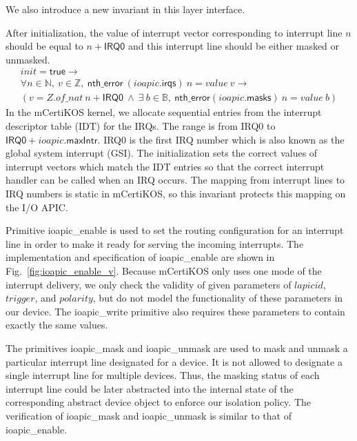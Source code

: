 We also introduce a new invariant in this layer interface.

\begin{invariant}
	After initialization, the value of interrupt vector corresponding to interrupt line $n$ should be equal to $n + \textsf{IRQ0}$ and this interrupt line should be either masked or unmasked.
	\[
	\begin{array}{l}
	init = \textsf{true} \rightarrow \\
	\forall n \in \mathbb{N}, ~ v \in \mathbb{Z},~
	\textsf{nth\_error}~ (ioapic.\textsf{irqs})~ n = value~ v \rightarrow \\
	( v = Z.of\_nat~ n + \textsf{IRQ0}  ~\wedge~ 
	\exists~ b \in \mathbb{B},~ \textsf{nth\_error} (ioapic.\textsf{masks})~ n = value~ b)
	\end{array}
	\]
	\noindent\textnormal{In the mCertiKOS kernel, we allocate sequential entries from
		the interrupt descriptor table (IDT) for the IRQs. The range is from
		\textsf{IRQ0} to $\textsf{IRQ0} + ioapic.\textsf{maxIntr}$. \textsf{IRQ0} is the
		first IRQ number which is also known as the global system interrupt (GSI). The
		initialization sets the correct values of interrupt vectors which match the IDT
		entries so that the correct interrupt handler can be called when an IRQ occurs.
		The mapping from interrupt lines to IRQ numbers is static in mCertiKOS, so this
		invariant protects this mapping on the I/O APIC. }
\end{invariant}

Primitive \textsf{ioapic\_enable} is used to set the routing configuration for
an interrupt line in order to make it ready for serving the incoming interrupts.
The implementation and specification of \textsf{ioapic\_enable} are shown in
Fig.~\ref{fig:ioapic_enable_v}. Because mCertiKOS only uses one mode of the
interrupt delivery, we only check the validity of given parameters of $lapicid$,
$trigger$, and $polarity$, but do not model the functionality of these
parameters in our device. The \textsf{ioapic\_write} primitive also requires
these parameters to contain exactly the same values.

The primitives \textsf{ioapic\_mask} and \textsf{ioapic\_unmask} are used to
mask and unmask a particular interrupt line designated for a device. It is not
allowed to designate a single interrupt line for multiple devices. Thus, the
masking status of each interrupt line could be later abstracted into the
internal state of the corresponding abstract device object to enforce our isolation
policy. The verification of \textsf{ioapic\_mask} and \textsf{ioapic\_unmask}
is similar to that of \textsf{ioapic\_enable}.

